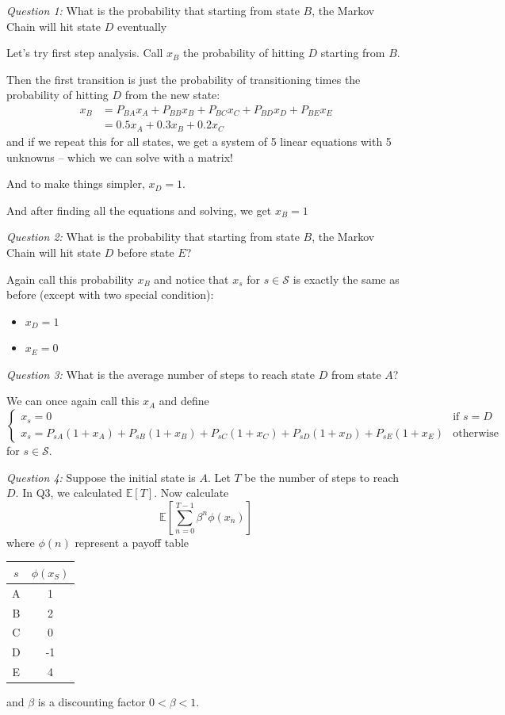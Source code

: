 \documentclass[12pt]{report}
\newcommand{\E}{\mathbb{E}}
\renewcommand{\S}{\mathcal{S}}
\begin{document}
    \emph{Question 1:} What is the probability that starting from state $B$, the Markov Chain will hit state $D$ eventually

    Let's try first step analysis. Call $x_B$ the probability of hitting $D$ starting from $B$. 
    
    Then the first transition is just the probability of transitioning times the probability of hitting $D$ from the new state:
    \begin{align*}
        x_B &= P_{BA} x_A + P_{BB} x_B + P_{BC} x_C + P_{BD} x_D + P_{BE} x_E\\ 
        &= 0.5x_A + 0.3x_B + 0.2x_C 
    \end{align*}
    and if we repeat this for all states, we get a system of 5 linear equations with 5 unknowns -- which we can solve with a matrix!

    And to make things simpler, $x_D = 1$.

    And after finding all the equations and solving, we get $\boxed{x_B = 1}$

    \emph{Question 2:} What is the probability that starting from state $B$, the Markov Chain will hit state $D$ before state $E$?

    Again call this probability $x_B$ and notice that $x_s$ for $s \in \S$ is exactly the same as before (except with two special condition):
    \begin{itemize}
        \item $x_D = 1$
        \item $x_E = 0$
    \end{itemize}

    \emph{Question 3:} What is the average number of steps to reach state $D$ from state $A$? 

    We can once again call this $x_A$ and define 
    \[\begin{cases}
        x_s = 0 & \text{if } s = D\\
        x_s = P_{sA} (1 + x_A) + P_{sB} (1 + x_B) + P_{sC} (1 + x_C) + P_{sD} (1 + x_D) + P_{sE} (1 + x_E) & \text{otherwise}
    \end{cases}\]
    for $s \in \S$.

    \emph{Question 4:} Suppose the initial state is $A$. Let $T$ be the number of steps to reach $D$. In Q3, we calculated $\E[T]$. Now calculate 
    \[\E\left[\sum_{n=0}^{T-1} \beta^n \phi(x_n) \right]\]
    where $\phi(n)$ represent a payoff table 
    \begin{center}
        \begin{tabular}{c|c}
            $s$ & $\phi(x_S)$\\ 
            \hline
            A & 1\\ 
            B & 2\\ 
            C & 0\\ 
            D & -1\\ 
            E & 4            
        \end{tabular}
    \end{center}
    and $\beta$ is a discounting factor $0 < \beta < 1$.
\end{document}
